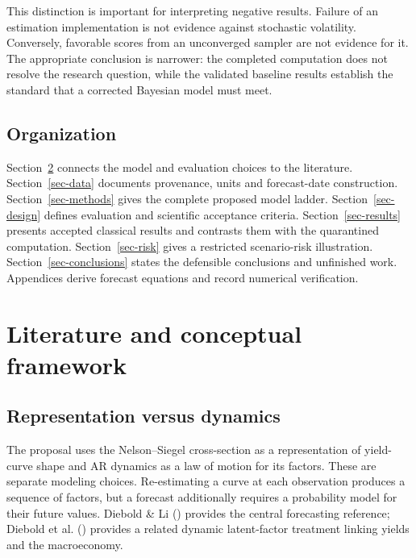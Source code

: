 \documentclass[
  12pt,
  letterpaper,
  DIV=11,
  numbers=noendperiod]{scrreprt}
\begin{document}
This distinction is important for interpreting negative results. Failure
of an estimation implementation is not evidence against stochastic
volatility. Conversely, favorable scores from an unconverged sampler are
not evidence for it. The appropriate conclusion is narrower: the
completed computation does not resolve the research question, while the
validated baseline results establish the standard that a corrected
Bayesian model must meet.

\section{Organization}\label{organization}

Section~\ref{sec-literature} connects the model and evaluation choices
to the literature. Section~\ref{sec-data} documents provenance, units
and forecast-date construction. Section~\ref{sec-methods} gives the
complete proposed model ladder. Section~\ref{sec-design} defines
evaluation and scientific acceptance criteria. Section~\ref{sec-results}
presents accepted classical results and contrasts them with the
quarantined computation. Section~\ref{sec-risk} gives a restricted
scenario-risk illustration. Section~\ref{sec-conclusions} states the
defensible conclusions and unfinished work. Appendices derive forecast
equations and record numerical verification.

\chapter{Literature and conceptual framework}\label{sec-literature}

\section{Representation versus
dynamics}\label{representation-versus-dynamics}

The proposal uses the Nelson--Siegel cross-section as a representation
of yield-curve shape and AR dynamics as a law of motion for its factors.
These are separate modeling choices. Re-estimating a curve at each
observation produces a sequence of factors, but a forecast additionally
requires a probability model for their future values. Diebold \& Li
() provides the central
forecasting reference; Diebold et al.
() provides a related
dynamic latent-factor treatment linking yields and the macroeconomy.
\end{document}
